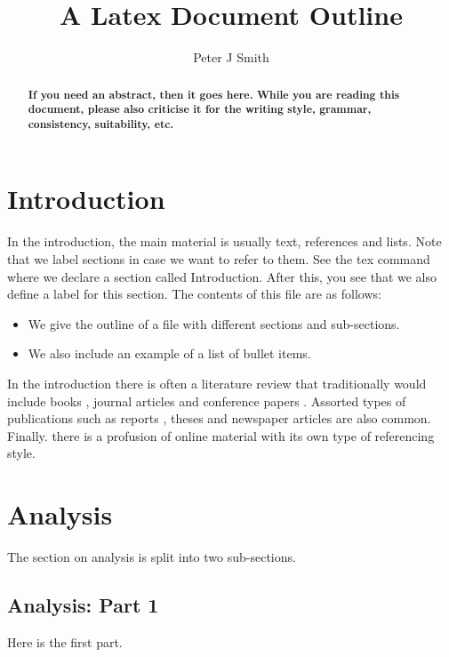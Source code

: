 \documentclass{article}
\begin{document}
\title{A Latex Document Outline}

\author{Peter J Smith}

\maketitle

\begin{abstract}
\textbf{If you need an abstract, then it goes here. While you are reading this document, please also criticise it for the writing style, grammar, consistency, suitability, etc. }
\end{abstract}

\section{Introduction}\label{intro}
In the introduction, the main material is usually text, references and lists. Note that we label sections in case we want to refer to them. See the tex command where we declare a section called Introduction. After this, you see that we also define a label for this section. The contents of this file are as follows: 
\begin{itemize}
\item We give the outline of a file with different sections and sub-sections. 
\item We also include an example of a list of bullet items.
\end{itemize}

In the introduction there is often a literature review that traditionally would include books \cite{gradshteyn2007,directional}, journal articles \cite{mrc_paper} and conference papers \cite{zhu_matrix}. Assorted types of publications such as reports \cite{3GPP}, theses \cite{Tataria_PhDThesis} and newspaper articles are also common. Finally. there is a profusion of online material with its own type of referencing style. 



\section{Analysis}\label{analysis}
The section on analysis is split into two sub-sections. 

\subsection{Analysis: Part 1}\label{analysis1}
Here is the first part.
\end{document}
